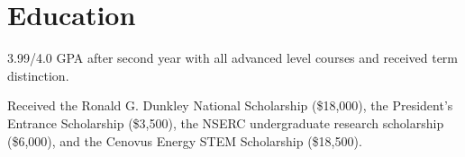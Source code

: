 \section{Education}

\begin{resumeItem}
\begin{resumeList}
    \item 3.99/4.0 GPA after second year with all advanced level courses and received term distinction.
    \item Received the Ronald G. Dunkley National Scholarship (\$18,000), the President's Entrance Scholarship (\$3,500), the NSERC undergraduate research scholarship (\$6,000), and the Cenovus Energy STEM Scholarship (\$18,500).
\end{resumeList}
\end{resumeItem}


